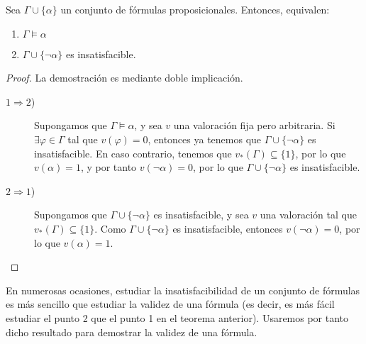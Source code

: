 \begin{teo}
    Sea $\Gamma\cup \{\alpha\}$ un conjunto de fórmulas proposicionales. Entonces, equivalen:
    \begin{enumerate}
        \item $\Gamma\vDash \alpha$
        \item $\Gamma\cup \{\lnot \alpha\}$ es insatisfacible.
    \end{enumerate}

    \begin{proof}
        La demostración es mediante doble implicación.
        \begin{description}
            \item[$1\Longrightarrow 2$)] Supongamos que $\Gamma\vDash \alpha$, y sea $v$ una valoración fija pero arbitraria.
            Si $\exists \varphi\in \Gamma$ tal que $v(\varphi)=0$, entonces ya tenemos que $\Gamma \cup \{\lnot \alpha\}$ es insatisfacible.
            En caso contrario, tenemos que $v_\ast(\Gamma)\subseteq \{1\}$, por lo que $v(\alpha)=1$, y por tanto $v(\lnot \alpha)=0$, por lo que $\Gamma\cup \{\lnot \alpha\}$ es insatisfacible.

            \item[$2\Longrightarrow 1$)] Supongamos que $\Gamma\cup \{\lnot \alpha\}$ es insatisfacible,
            y sea $v$ una valoración tal que $v_\ast(\Gamma)\subseteq \{1\}$.
            Como $\Gamma\cup \{\lnot \alpha\}$ es insatisfacible, entonces $v(\lnot \alpha)=0$, por lo que $v(\alpha)=1$.
        \end{description}
    \end{proof}
\end{teo}
\begin{observacion}
    En numerosas ocasiones, estudiar la insatisfacibilidad de un conjunto de fórmulas es más sencillo que estudiar la validez de una fórmula
    (es decir, es más fácil estudiar el punto 2 que el punto 1 en el teorema anterior). Usaremos por tanto dicho resultado para demostrar la validez de una fórmula.
\end{observacion}



